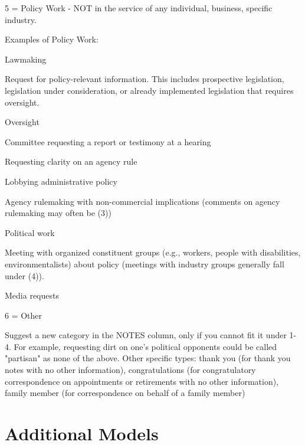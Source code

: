 \documentclass[12pt]{article}
\newenvironment{tight_itemize}{
\begin{itemize}
 \setlength{\itemsep}{0pt}
 \setlength{\parskip}{0pt}
 }{\end{itemize}}
\begin{document}
{5 = Policy Work - NOT in the service of any individual, business, specific industry.\\

\hfill\begin{minipage}{\dimexpr\textwidth-2cm}
Examples of Policy Work: 
 \begin{tight_itemize} 
 \item Lawmaking 
\item Request for policy-relevant information. This includes prospective legislation, legislation under consideration, or already implemented legislation that requires oversight.  
\item Oversight
\item Committee requesting a report or testimony at a hearing
\item Requesting clarity on an agency rule
\item Lobbying administrative policy
\item Agency rulemaking with non-commercial implications (comments on agency rulemaking may often be (3)) 
\item Political work
\item Meeting with organized constituent groups (e.g., workers, people with disabilities, environmentalists) about policy (meetings with industry groups generally fall under (4)).
\item Media requests
 \end{tight_itemize} 
\end{minipage}
\bigskip


6 = Other \\

\hfill\begin{minipage}{\dimexpr\textwidth-2cm}
	Suggest a new category in the NOTES column, only if you cannot fit it under 1-4. For example, requesting dirt on one's political opponents could be called "partisan" as none of the above. Other specific types: thank you (for thank you notes with no other information), congratulations (for congratulatory correspondence on appointments or retirements with no other information), family member (for correspondence on behalf of a family member) \\
\end{minipage}

\clearpage


\section{Additional Models} \label{s:appendix_models}

}
\end{document}
